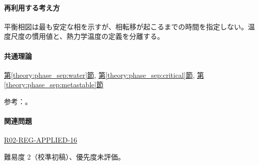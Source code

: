 \paragraph{再利用する考え方} 平衡相図は最も安定な相を示すが、相転移が起こるまでの時間を指定しない。温度尺度の慣用値と、熱力学温度の定義を分離する。

\paragraph{共通理論} \hyperref[theory:phase_sep:water]{第\ref*{theory:phase_sep:water}節}, \hyperref[theory:phase_sep:critical]{第\ref*{theory:phase_sep:critical}節}, \hyperref[theory:phase_sep:metastable]{第\ref*{theory:phase_sep:metastable}節}

\par 参考：\cite{iapws_supercooled2015,iapws95_2018,si_brochure9}。

\paragraph{関連問題} \hyperref[q:r02-reg-applied-16]{R02-REG-APPLIED-16}

\par 難易度 2（校準初稿）、優先度未評価。
